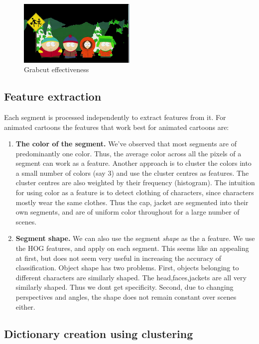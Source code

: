 \documentclass[10pt,twocolumn,letterpaper]{article}
\begin{document}
\begin{figure}[H]
  \centering
  \includegraphics[width=0.5\textwidth]{../results/grabcut_full.png}
  \caption{Grabcut effectiveness}
  \label{grabcut}
\end{figure}

\subsection{Feature extraction}
Each segment is processed independently to extract features from
it. For animated cartoons the features that work best for animated
cartoons are:
\begin{enumerate}
\item \textbf{The color of the segment. } We've observed that most
  segments are of predominantly one color. Thus, the average color
  across all the pixels of a segment can work as a feature. Another
  approach is to cluster the colors into a small number of colors (say
  3) and use the cluster centres as features. The cluster centres are
  also weighted by their frequency (histogram).  The intuition for
  using color as a feature is to detect clothing of characters, since
  characters mostly wear the same clothes. Thus the cap, jacket are
  segmented into their own segments, and are of uniform color
  throughout for a large number of scenes.

\item \textbf{Segment shape. } We can also use the segment
  \emph{shape} as the a feature. We use the HOG features, and apply on
  each segment. This seems like an appealing at first, but does not
  seem very useful in increasing the accuracy of
  classification. Object shape has two problems. First, objects
  belonging to different characters are similarly shaped. The
  head,faces,jackets are all very similarly shaped. Thus we dont get
  specificity. Second, due to changing perspectives and angles, the
  shape does not remain constant over scenes either. 

\end{enumerate}

\subsection{Dictionary creation using clustering} 
\end{document}
